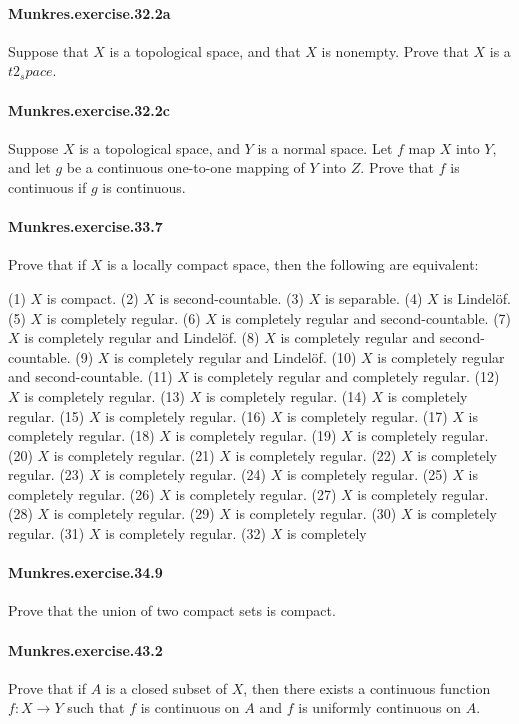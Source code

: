 \documentclass{article}
\begin{document}
{\paragraph{Munkres.exercise.32.2a} Suppose that $X$ is a topological space, and that $X$ is nonempty. Prove that $X$ is a $t2_space$.

\paragraph{Munkres.exercise.32.2c} Suppose $X$ is a topological space, and $Y$ is a normal space. Let $f$ map $X$ into $Y$, and let $g$ be a continuous one-to-one mapping of $Y$ into $Z$. Prove that $f$ is continuous if $g$ is continuous.

\paragraph{Munkres.exercise.33.7} Prove that if $X$ is a locally compact space, then the following are equivalent:

(1) $X$ is compact.
(2) $X$ is second-countable.
(3) $X$ is separable.
(4) $X$ is Lindelöf.
(5) $X$ is completely regular.
(6) $X$ is completely regular and second-countable.
(7) $X$ is completely regular and Lindelöf.
(8) $X$ is completely regular and second-countable.
(9) $X$ is completely regular and Lindelöf.
(10) $X$ is completely regular and second-countable.
(11) $X$ is completely regular and completely regular.
(12) $X$ is completely regular.
(13) $X$ is completely regular.
(14) $X$ is completely regular.
(15) $X$ is completely regular.
(16) $X$ is completely regular.
(17) $X$ is completely regular.
(18) $X$ is completely regular.
(19) $X$ is completely regular.
(20) $X$ is completely regular.
(21) $X$ is completely regular.
(22) $X$ is completely regular.
(23) $X$ is completely regular.
(24) $X$ is completely regular.
(25) $X$ is completely regular.
(26) $X$ is completely regular.
(27) $X$ is completely regular.
(28) $X$ is completely regular.
(29) $X$ is completely regular.
(30) $X$ is completely regular.
(31) $X$ is completely regular.
(32) $X$ is completely

\paragraph{Munkres.exercise.34.9} Prove that the union of two compact sets is compact.

\paragraph{Munkres.exercise.43.2} Prove that if $A$ is a closed subset of $X$, then there exists a continuous function $f : X → Y$ such that $f$ is continuous on $A$ and $f$ is uniformly continuous on $A$.

}
\end{document}
